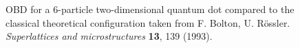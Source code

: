 \begin{frame}
 \begin{figure}
 \begin{center}
  \label{fig:wigner20}
  \caption{OBD for a 6-particle two-dimensional quantum dot compared to the classical theoretical configuration taken from F. Bolton, U. Rössler.  \textit{Superlattices and microstructures} \textbf{13}, 139 (1993).}
 \end{center}
\end{figure}
\end{frame}

